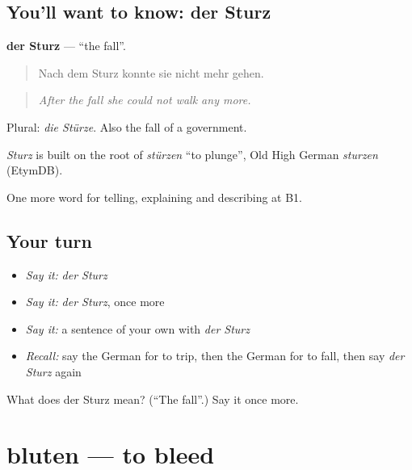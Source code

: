 \subsection*{You'll want to know: der Sturz}
\textbf{der Sturz} — \textquotedblleft{}the fall\textquotedblright{}.

\begin{quote}
Nach dem Sturz konnte sie nicht mehr gehen.
\end{quote}

\begin{quote}
\emph{After the fall she could not walk any more.}
\end{quote}

Plural: \emph{die Stürze}. Also the fall of a government.

\begin{cousinweb}
\emph{Sturz} is built on the root of \emph{stürzen} \textquotedblleft{}to plunge\textquotedblright{}, Old High German \emph{sturzen} (EtymDB).
\end{cousinweb}

\begin{grammarlens}[title={What you've built}]
One more word for telling, explaining and describing at B1.
\end{grammarlens}

\subsection*{Your turn}
\begin{itemize}
\raggedright
  \item \emph{Say it:} \emph{der Sturz}
  \item \emph{Say it:} \emph{der Sturz}, once more
  \item \emph{Say it:} a sentence of your own with \emph{der Sturz}
  \item \emph{Recall:} say the German for to trip, then the German for to fall, then say \emph{der Sturz} again
\end{itemize}

\begin{tcolorbox}[breakable,colback=teal!4,colframe=teal!35!black,title={Before you move on}]
What does der Sturz mean? (\textquotedblleft{}The fall\textquotedblright{}.) Say it once more.
\end{tcolorbox}
\section[bluten]{bluten — to bleed}

